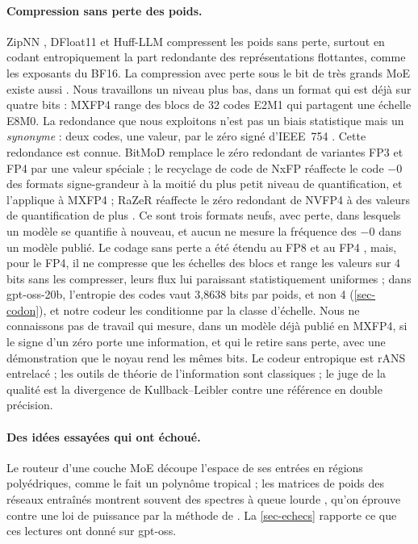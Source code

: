 \documentclass[11pt, a4paper]{article}
\theoremstyle{remark}
\begin{document}
\paragraph{Compression sans perte des poids.} ZipNN \citep{hershcovitch2024zipnn}, DFloat11 \citep{zhang2025dfloat11} et Huff-LLM \citep{yubeaton2025huffllm} compressent les poids sans perte, surtout en codant entropiquement la part redondante des représentations flottantes, comme les exposants du BF16. La compression avec perte sous le bit de très grands MoE existe aussi \citep{frantar2023qmoe}. Nous travaillons un niveau plus bas, dans un format qui est déjà sur quatre bits : MXFP4 \citep{ocpmx2023,rouhani2023microscaling} range des blocs de 32 codes E2M1 qui partagent une échelle E8M0. La redondance que nous exploitons n'est pas un biais statistique mais un \emph{synonyme} : deux codes, une valeur, par le zéro signé d'IEEE~754 \citep{ieee754}. Cette redondance est connue. BitMoD remplace le zéro redondant de variantes FP3 et FP4 par une valeur spéciale \citep{chen2024bitmod} ; le recyclage de code de NxFP réaffecte le code $-0$ des formats signe-grandeur à la moitié du plus petit niveau de quantification, et l'applique à MXFP4 \citep{lo2024nxfp} ; RaZeR réaffecte le zéro redondant de NVFP4 à des valeurs de quantification de plus \citep{chen2025razer}. Ce sont trois formats neufs, avec perte, dans lesquels un modèle se quantifie à nouveau, et aucun ne mesure la fréquence des $-0$ dans un modèle publié. Le codage sans perte a été étendu au FP8 et au FP4 \citep{heilper2025lossless}, mais, pour le FP4, il ne compresse que les échelles des blocs et range les valeurs sur 4 bits sans les compresser, leurs flux lui paraissant statistiquement uniformes ; dans gpt-oss-20b, l'entropie des codes vaut 3,8638 bits par poids, et non 4 (\cref{sec-codon}), et notre codeur les conditionne par la classe d'échelle. Nous ne connaissons pas de travail qui mesure, dans un modèle déjà publié en MXFP4, si le signe d'un zéro porte une information, et qui le retire sans perte, avec une démonstration que le noyau rend les mêmes bits. Le codeur entropique est rANS entrelacé \citep{duda2013ans,giesen2014interleaved} ; les outils de théorie de l'information sont classiques \citep{cover2006} ; le juge de la qualité est la divergence de Kullback--Leibler \citep{kullback1951} contre une référence en double précision.

\paragraph{Des idées essayées qui ont échoué.} Le routeur d'une couche MoE découpe l'espace de ses entrées en régions polyédriques, comme le fait un polynôme tropical \citep{zhang2018tropical} ; les matrices de poids des réseaux entraînés montrent souvent des spectres à queue lourde \citep{martin2018implicit}, qu'on éprouve contre une loi de puissance par la méthode de \citet{clauset2009power}. La \cref{sec-echecs} rapporte ce que ces lectures ont donné sur gpt-oss.
\end{document}
